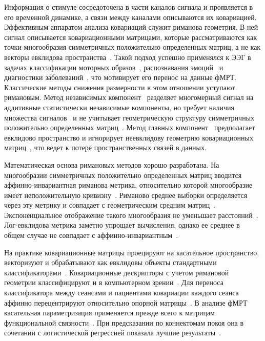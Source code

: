 Информация о стимуле сосредоточена в части каналов сигнала и проявляется в его временной динамике, а связи между каналами описываются их ковариацией. Эффективным аппаратом анализа ковариаций служит риманова геометрия. В ней сигнал описывается ковариационными матрицами, которые рассматриваются как точки многообразия симметричных положительно определенных матриц, а не как векторы евклидова пространства~\cite{barachant2010riemannian, barachant2011multiclass, barachant2011channel}. Такой подход успешно применялся к ЭЭГ в задачах классификации моторных образов~\cite{congedo2017riemannian, yger2016riemannian, samokhina2022classification, guan2019motor, xie2022multiple}, распознавания эмоций~\cite{wu2022novel} и диагностики заболеваний~\cite{shariat2021automatic, kloppel2012diagnostic}, что мотивирует его перенос на данные фМРТ. Классические методы снижения размерности в этом отношении уступают римановым. Метод независимых компонент~\cite{hyvarinen2000independent} разделяет многомерный сигнал на аддитивные статистически независимые компоненты, но требует наличия множества сигналов~\cite{James_2005} и не учитывает геометрическую структуру симметричных положительно определенных матриц~\cite{you2021re}. Метод главных компонент~\cite{Jolliffe2002} предполагает евклидово пространство и игнорирует неевклидову геометрию ковариационных матриц~\cite{horev2016geometry}, что ведет к потере пространственных связей в данных.

Математическая основа римановых методов хорошо разработана. На многообразии симметричных положительно определенных матриц вводится аффинно-инвариантная риманова метрика, относительно которой многообразие имеет неположительную кривизну~\cite{bhatia2007positive}. Риманово среднее выборки определяется через эту метрику и совпадает с геометрическим средним матриц~\cite{moakher2005differential}. Экспоненциальное отображение такого многообразия не уменьшает расстояний~\cite{bhatia2003exponential}. Лог-евклидова метрика заметно упрощает вычисления, однако ее среднее в общем случае не совпадает с аффинно-инвариантным~\cite{arsigny2007geometric}.

На практике ковариационные матрицы проецируют на касательное пространство, векторизуют и обрабатывают как евклидовы объекты стандартными классификаторами~\cite{barachant2011multiclass}. Ковариационные дескрипторы с учетом римановой геометрии классифицируют и в компьютерном зрении~\cite{tuzel2008pedestrian}. Для переноса классификатора между сеансами и пациентами ковариации каждого сеанса аффинно перецентрируют относительно опорной матрицы~\cite{zanini2018transfer}. В анализе фМРТ касательная параметризация применяется прежде всего к матрицам функциональной связности~\cite{you2021re, dadi2019benchmarking}. При предсказании по коннектомам покоя она в сочетании с логистической регрессией показала лучшие результаты~\cite{dadi2019benchmarking}.


